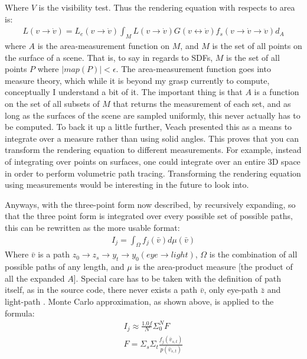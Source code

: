 \message{ !name(test.tex)}\documentclass{article}
\begin{document}
    Where $V$ is the visibility test. Thus the rendering equation with respects
    to area is:
  \begin{align}
    L(v \rightarrow \dot{v}) = L_e(v \rightarrow \dot{v}) \int_ML(v \rightarrow
    \dot{v}) G(v\leftrightarrow \dot{v}) f_s(v\rightarrow \dot{v} \rightarrow
    \ddot{v}) d_A
  \end{align}
    where $A$ is the area-measurement function on $M$, and $M$ is the set of all
points on the surface of a scene. That is, to say in regards to SDFs, $M$ is the
set of all points $P$ where $|map(P)| < \epsilon$. The area-measurement function
goes into measure theory, which while it is beyond my grasp currently to
compute, conceptually I understand a bit of it. The important thing is that $A$
is a function on the set of all subsets of $M$ that returns the measurement of
each set, and as long as the surfaces of the scene are sampled uniformly, this
never actually has to be computed. To back it up a little further, Veach
presented this as a means to integrate over a measure rather than using solid
angles. This proves that you can transform the rendering equation to different
measurements. For example, instead of integrating over points on surfaces, one
could integrate over an entire 3D space in order to perform volumetric path
tracing. Transforming the rendering equation using measurements would be
interesting in the future to look into.
    
    
    Anyways, with the three-point form now described, by recursively expanding,
so that the three point form is integrated over every possible set of possible
paths, this can be rewritten as the more usable format:
  \begin{align} I_j = \int_\Omega f_j(\bar{v}) d\mu(\bar{v}) \end{align}
    Where $\bar{v}$ is a path $z_0\rightarrow z_s \rightarrow y_t \rightarrow
    y_0 (eye \rightarrow light)$, $\Omega$ is the combination of all possible
    paths of any length, and $\mu$ is the area-product measure [the product of
all the expanded $A$]. Special care has to be taken with the definition of
    path itself, as in the source code, there never exists a path $\bar{v}$,
    only eye-path $\bar{z}$ and light-path . Monte Carlo approximation, as shown
above, is applied to the formula:
  \begin{align}
    I_j \approx \frac{1.0f}{N}\Sigma_0^NF\\
    F = \Sigma_s\Sigma_t\frac{f_j(\bar{v}_{s, t})}{p(\bar{v}_{s, t})}
  \end{align}
\end{document}
